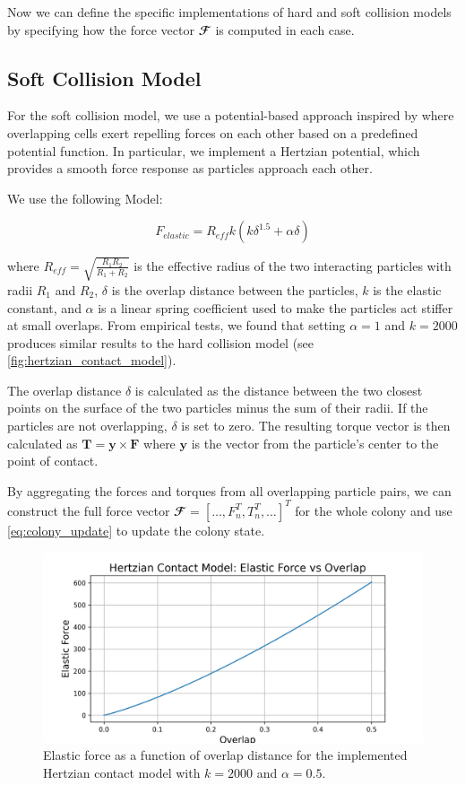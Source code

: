\documentclass[conference]{IEEEtran}
\begin{document}
Now we can define the specific implementations of hard and soft collision models by specifying how the force vector $\mathbfcal{F}$ is computed in each case.

\newpage

\subsection{Soft Collision Model}

For the soft collision model, we use a potential-based approach inspired by \cite{Warren2019} where overlapping cells exert repelling forces on each other based on a predefined potential function. In particular, we implement a Hertzian potential, which provides a smooth force response as particles approach each other.

We use the following Model:

$$
    F_{elastic} = R_{eff} k \left( k \delta^{1.5} + \alpha \delta \right)
$$

where $R_{eff} = \sqrt{\frac{R_1 R_2}{R_1 + R_2}}$ is the effective radius of the two interacting particles with radii $R_1$ and $R_2$, $\delta$ is the overlap distance between the particles, $k$ is the elastic constant, and $\alpha$ is a linear spring coefficient used to make the particles act stiffer at small overlaps. From empirical tests, we found that setting $\alpha = 1$ and $k = 2000$ produces similar results to the hard collision model (see \autoref{fig:hertzian_contact_model}).

The overlap distance $\delta$ is calculated as the distance between the two closest points on the surface of the two particles minus the sum of their radii. If the particles are not overlapping, $\delta$ is set to zero. The resulting torque vector is then calculated as $\mathbf{T} = \mathbf{y} \times \mathbf{F}$ where $\mathbf{y}$ is the vector from the particle's center to the point of contact.

By aggregating the forces and torques from all overlapping particle pairs, we can construct the full force vector $\mathbfcal{F} = [ \dots, F_n^T, T_n^T, \dots]^T$ for the whole colony and use \autoref{eq:colony_update} to update the colony state.

\begin{figure}[H]
    \centering
    \includegraphics[width=\linewidth]{figures/hertzian_contact_model.png}
    \caption{Elastic force as a function of overlap distance for the implemented Hertzian contact model with $k=2000$ and $\alpha=0.5$.}
    \label{fig:hertzian_contact_model}
\end{figure}
\end{document}
